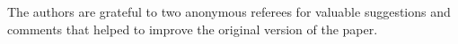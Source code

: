\documentclass[10pt]{article}
\def\Z{\mathbb{Z}}
\begin{document}



 The authors are grateful to two
anonymous referees for valuable suggestions and comments
that helped to  improve the original version
of the paper.
\end{document}
